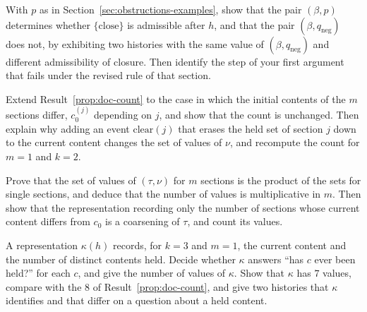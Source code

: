 \begin{exercise}
With $p$ as in Section~\ref{sec:obstructions-examples}, show that the pair $(\beta,p)$ determines whether $\{\mathrm{close}\}$ is admissible after $h$, and that the pair $(\beta,q_{\mathrm{neg}})$ does not, by exhibiting two histories with the same value of $(\beta,q_{\mathrm{neg}})$ and different admissibility of closure. Then identify the step of your first argument that fails under the revised rule of that section.
\end{exercise}


\begin{exercise}
Extend Result~\ref{prop:doc-count} to the case in which the initial contents of the $m$ sections differ, $c_0^{(j)}$ depending on $j$, and show that the count is unchanged. Then explain why adding an event $\mathrm{clear}(j)$ that erases the held set of section $j$ down to the current content changes the set of values of $\nu$, and recompute the count for $m=1$ and $k=2$.
\end{exercise}

\begin{exercise}
Prove that the set of values of $(\tau,\nu)$ for $m$ sections is the product of the sets for single sections, and deduce that the number of values is multiplicative in $m$. Then show that the representation recording only the number of sections whose current content differs from $c_0$ is a coarsening of $\tau$, and count its values.
\end{exercise}

\begin{exercise}
A representation $\kappa(h)$ records, for $k=3$ and $m=1$, the current content and the number of distinct contents held. Decide whether $\kappa$ answers ``has $c$ ever been held?'' for each $c$, and give the number of values of $\kappa$. Show that $\kappa$ has $7$ values, compare with the $8$ of Result~\ref{prop:doc-count}, and give two histories that $\kappa$ identifies and that differ on a question about a held content.\label{ex:kappa7}
\end{exercise}

